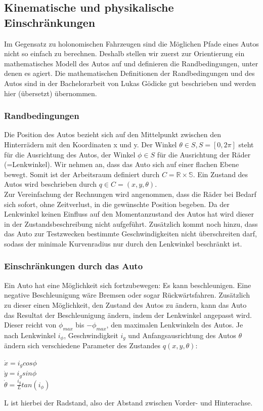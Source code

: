 \subsection{Kinematische und physikalische Einschränkungen}
Im Gegensatz zu holonomischen Fahrzeugen sind die Möglichen Pfade eines Autos nicht so einfach zu berechnen. Deshalb stellen wir zuerst zur Orientierung ein mathematisches Modell des Autos auf und definieren die Randbedingungen, unter denen es agiert.
Die mathematischen Definitionen der Randbedingungen und des Autos sind in der Bachelorarbeit von Lukas Gödicke \citep{Goedicke18} gut beschrieben und werden hier (übersetzt) übernommen. \\
\subsubsection{Randbedingungen}
Die Position des Autos bezieht sich auf den Mittelpunkt zwischen den Hinterrädern mit den Koordinaten x und y. Der Winkel $\theta \in S,  S=[0,2\pi]$ steht für die Ausrichtung des Autos, der Winkel $\phi \in S$ für die Ausrichtung der Räder (=Lenkwinkel). Wir nehmen an, dass das Auto sich auf einer flachen Ebene bewegt. Somit ist der Arbeitsraum definiert durch $C =  \mathbb{R \times S}$. Ein Zustand des Autos wird beschrieben durch $q \in C = (x,y,\theta)$.\\
Zur Vereinfachung der Rechnungen wird angenommen, dass die Räder bei Bedarf sich sofort, ohne Zeitverlust, in die gewünschte Position begeben. Da der Lenkwinkel keinen Einfluss auf den Momentanzustand des Autos hat wird dieser in der Zustandsbeschreibung nicht aufgeführt. Zusätzlich kommt noch hinzu, dass das Auto zur Testzwecken bestimmte Geschwindigkeiten nicht überschreiten darf, sodass der minimale Kurvenradius nur durch den Lenkwinkel beschränkt ist. \\

\subsubsection{Einschränkungen durch das Auto}
Ein Auto hat eine Möglichkeit sich fortzubewegen: Es kann beschleunigen. Eine negative Beschleunigung wäre Bremsen oder sogar Rückwärtsfahren. Zusätzlich zu dieser einen Möglichkeit, den Zustand des Autos zu ändern, kann das Auto das Resultat der Beschleunigung ändern, indem der Lenkwinkel angepasst wird. Dieser reicht von $\phi_{max}$ bis $-\phi_{max}$, den maximalen Lenkwinkeln des Autos.
Je nach Lenkwinkel $i_{\phi}$, Geschwindigkeit $i_g$ und Anfangsausrichtung des Autos $\theta$ ändern sich verschiedene Parameter des Zustandes $q(x,y, \theta) $: \\
\begin{center}
$ \dot{x} = i_g cos \phi $ \\
$ \dot{y} = i_g sin \phi$ \\
$ \dot{{\theta}} = \frac{i_g}{L} tan (i_{\phi}) $
\end{center}
L ist hierbei der Radstand, also der Abstand zwischen Vorder- und Hinterachse.

